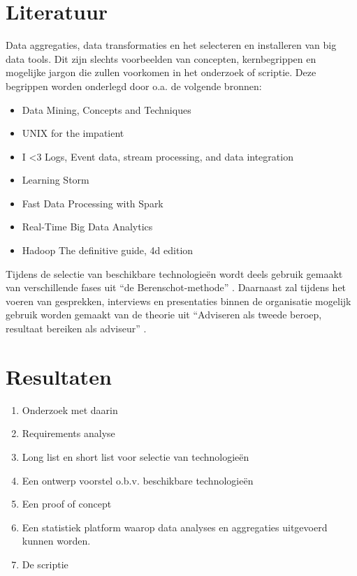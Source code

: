 \section{Literatuur} %

Data aggregaties, data transformaties en het selecteren en installeren van big data tools. Dit zijn slechts voorbeelden van concepten, kernbegrippen en mogelijke jargon die zullen voorkomen in het onderzoek of scriptie. Deze begrippen worden onderlegd door o.a. de volgende bronnen:

\begin{itemize}
    \item Data Mining, Concepts and Techniques \parencite{data-mining}
    \item UNIX for the impatient \parencite{unix}
    \item I <3 Logs, Event data, stream processing, and data integration \parencite{logs}
    \item Learning Storm \parencite{learning-storm}
    \item Fast Data Processing with Spark \parencite{spark}
    \item Real-Time Big Data Analytics \parencite{realtime-architectures}
    \item Hadoop The definitive guide, 4d edition \parencite{hadoop-definitive}
\end{itemize}

Tijdens de selectie van beschikbare technologieën wordt deels gebruik gemaakt van verschillende fases uit “de Berenschot-methode” \parencite{cuppen}.
Daarnaast zal tijdens het voeren van gesprekken, interviews en presentaties binnen de organisatie mogelijk gebruik worden gemaakt van de theorie uit “Adviseren als tweede beroep, resultaat bereiken als adviseur” \parencite{adviseren}.

\section{Resultaten} %


\begin{enumerate}
    \item Onderzoek met daarin
    \item Requirements analyse
    \item Long list en short list voor selectie van technologieën
    \item Een ontwerp voorstel o.b.v. beschikbare technologieën
    \item Een proof of concept
    \item Een statistiek platform waarop data analyses en aggregaties uitgevoerd kunnen worden.
    \item De scriptie
\end{enumerate}

